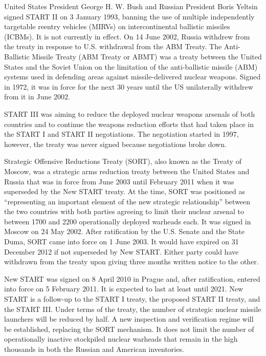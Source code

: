 \documentclass[twoside,titlepage,11pt,twocolumn,a4paper]{article}
\begin{document}
United States President George H. W. Bush and Russian President Boris
Yeltsin signed START II on 3 January 1993, banning the use of multiple
independently targetable reentry vehicles (MIRVs) on intercontinental
ballistic missiles (ICBMs). \citep{startII} It is not currently in
effect. On 14 June 2002, Russia withdrew from the treaty in response
to U.S. withdrawal from the ABM Treaty. The Anti-Ballistic Missile
Treaty (ABM Treaty or ABMT) was a treaty between the United States and
the Soviet Union on the limitation of the anti-ballistic missile (ABM)
systems used in defending areas against missile-delivered nuclear
weapons. Signed in 1972, it was in force for the next 30 years until
the US unilaterally withdrew from it in June 2002. \citep{burr2001}

START III was aiming to reduce the deployed nuclear weapons arsenals
of both countries and to continue the weapons reduction efforts that
had taken place in the START I and START II
negotiations. \citep{startIII} The negotiation started in 1997,
however, the treaty was never signed because negotiations broke down.

Strategic Offensive Reductions Treaty (SORT), also known as the Treaty
of Moscow, was a strategic arms reduction treaty between the United
States and Russia that was in force from June 2003 until February 2011
when it was superseded by the New START treaty. \citep{USRussia} At
the time, SORT was positioned as ``representing an important element
of the new strategic relationship'' between the two countries with
both parties agreeing to limit their nuclear arsenal to between 1700
and 2200 operationally deployed warheads each. It was signed in Moscow
on 24 May 2002. After ratification by the U.S. Senate and the State
Duma, SORT came into force on 1 June 2003. It would have expired on 31
December 2012 if not superseded by New START. Either party could have
withdrawn from the treaty upon giving three months written notice to
the other.

New START was signed on 8 April 2010 in Prague and, after
ratification, entered into force on 5 February 2011. It is expected to
last at least until 2021. \citep{USAtoday} New START is a follow-up to
the START I treaty, the proposed START II treaty, and the START
III. Under terms of the treaty, the number of strategic nuclear
missile launchers will be reduced by half. A new inspection and
verification regime will be established, replacing the SORT
mechanism. It does not limit the number of operationally inactive
stockpiled nuclear warheads that remain in the high thousands in both
the Russian and American inventories.
\end{document}
